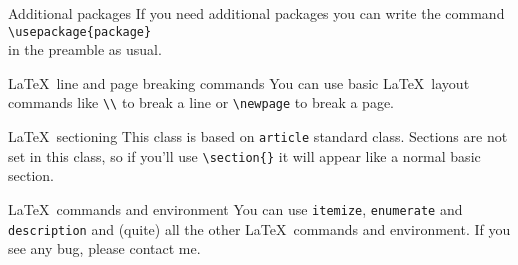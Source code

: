 \documentclass[english]{michael-cv}
\begin{document}


\begin{para}{Additional packages}
If you need additional packages you can write the command\\
\null\hspace{4ex}\verb+\usepackage{package}+\\[2ex]
in the preamble as usual.
\end{para}

\begin{para}{\LaTeX\ line and page breaking commands}
You can use basic \LaTeX\ layout commands like \verb+\\+ to break a line or \verb+\newpage+ to break a page.
\end{para}

\begin{para}{\LaTeX\ sectioning}
This class is based on \texttt{article} standard class. Sections are not set in this class, so if you'll use \verb+\section{}+ it will appear like a normal basic section.
\end{para}

\begin{para}{\LaTeX\ commands and environment}
You can use \texttt{itemize}, \texttt{enumerate} and \texttt{description} and (quite) all the other \LaTeX\ commands and environment. If you see any bug, please contact me.
\end{para}

\newpage
{}
\end{document}
